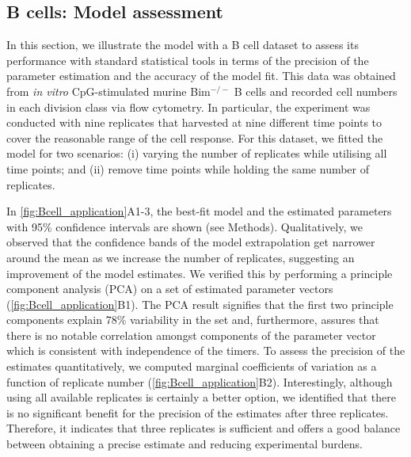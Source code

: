 \documentclass[11pt, a4paper]{article}
\begin{document}
\subsection{B cells: Model assessment}
\linenumbers
In this section, we illustrate the model with a B cell dataset to assess its performance with standard statistical tools in terms of the precision of the parameter estimation and the accuracy of the model fit. This data was obtained from \textit{in vitro} CpG-stimulated murine Bim$^{-/-}$ B cells and recorded cell numbers in each division class via flow cytometry. In particular, the experiment was conducted with nine replicates that harvested at nine different time points to cover the reasonable range of the cell response. For this dataset, we fitted the model for two scenarios: (i) varying the number of replicates while utilising all time points; and (ii) remove time points while holding the same number of replicates.

In \cref{fig:Bcell_application}A1-3, the best-fit model and the estimated parameters with 95\% confidence intervals are shown (see Methods). Qualitatively, we observed that the confidence bands of the model extrapolation get narrower around the mean as we increase the number of replicates, suggesting an improvement of the model estimates. We verified this by performing a principle component analysis (PCA) on a set of estimated parameter vectors (\cref{fig:Bcell_application}B1). The PCA result signifies that the first two principle components explain 78\% variability in the set and, furthermore, assures that there is no notable correlation amongst components of the parameter vector which is consistent with independence of the timers. To assess the precision of the estimates quantitatively, we computed marginal coefficients of variation as a function of replicate number (\cref{fig:Bcell_application}B2). Interestingly, although using all available replicates is certainly a better option, we identified that there is no significant benefit for the precision of the estimates after three replicates. Therefore, it indicates that three replicates is sufficient and offers a good balance between obtaining a precise estimate and reducing experimental burdens.
\end{document}
